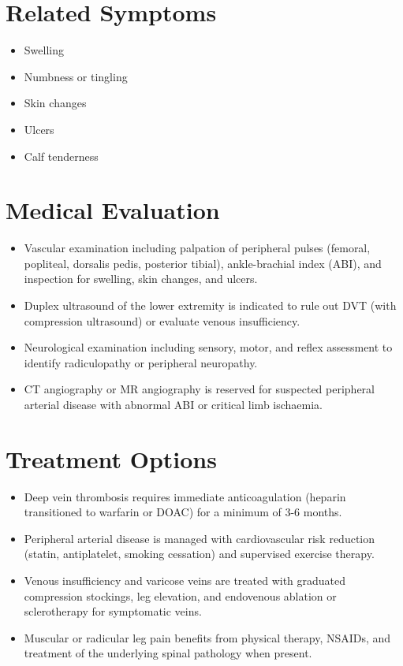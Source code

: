 \section*{Related Symptoms}
\begin{itemize}
  \item Swelling
  \item Numbness or tingling
  \item Skin changes
  \item Ulcers
  \item Calf tenderness
\end{itemize}

\section*{Medical Evaluation}
\begin{itemize}
  \item Vascular examination including palpation of peripheral pulses (femoral, popliteal, dorsalis pedis, posterior tibial), ankle-brachial index (ABI), and inspection for swelling, skin changes, and ulcers.
  \item Duplex ultrasound of the lower extremity is indicated to rule out DVT (with compression ultrasound) or evaluate venous insufficiency.
  \item Neurological examination including sensory, motor, and reflex assessment to identify radiculopathy or peripheral neuropathy.
  \item CT angiography or MR angiography is reserved for suspected peripheral arterial disease with abnormal ABI or critical limb ischaemia.
\end{itemize}

\section*{Treatment Options}
\begin{itemize}
  \item Deep vein thrombosis requires immediate anticoagulation (heparin transitioned to warfarin or DOAC) for a minimum of 3-6 months.
  \item Peripheral arterial disease is managed with cardiovascular risk reduction (statin, antiplatelet, smoking cessation) and supervised exercise therapy.
  \item Venous insufficiency and varicose veins are treated with graduated compression stockings, leg elevation, and endovenous ablation or sclerotherapy for symptomatic veins.
  \item Muscular or radicular leg pain benefits from physical therapy, NSAIDs, and treatment of the underlying spinal pathology when present.
\end{itemize}

